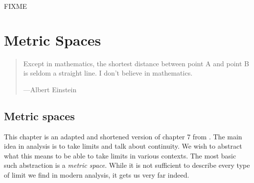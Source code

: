 \documentclass[12pt,openany]{book}
\newcommand{\myindex}[1]{#1\index{#1}}
\theoremstyle{plain}
\theoremstyle{remark}
\theoremstyle{definition}
\newenvironment{myquote}{%
    \begin{quote}%
    \begingroup\itshape
}{%
    \endgroup%
    \end{quote}
}
\theoremstyle{exercise}
\theoremstyle{example}
\begin{document}
FIXME






\appendix


\chapter{Metric Spaces} \label{ap:metric}

\begin{myquote}
Except in mathematics, the shortest distance between point A and point B is seldom a straight line. I don't believe in mathematics.

---Albert Einstein
\end{myquote}


\section{Metric spaces}
\label{sec:metric}

This chapter is an adapted and shortened version of chapter 7 from
\cite{ra:book}.
The main idea in analysis is to take limits and talk about continuity.
We wish to abstract what this means to be able to take limits in various
contexts.  The most basic such abstraction is a
\emph{\myindex{metric space}}.
While it
is not sufficient to describe every type of limit we find in modern
analysis, it gets us very far indeed.
\end{document}

